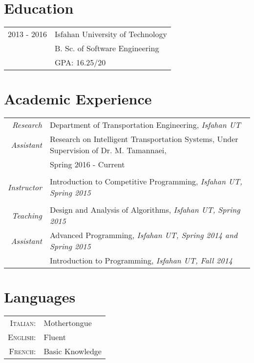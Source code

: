 \documentclass[a4paper,pt]{article}
\begin{document}
	
	\section{Education}
	\begin{tabular}{rl}	
		{2013 - 2016} & {Isfahan University of Technology}\\
					   & {\small B. Sc. of Software Engineering} \\
				       & {\small GPA: 16.25/20}
	\end{tabular}
	
	\section{Academic Experience}
		\begin{tabular}{r|p{11cm}}
			\emph{Research} & Department of Transportation Engineering, \emph{\color{darkgray}\small Isfahan UT} \\
			\emph{Assistant}&\footnotesize{Research on Intelligent Transportation Systems, Under Supervision of Dr. M. Tamannaei,}\\
			&\footnotesize{Spring 2016 - Current}\\
							
			\multicolumn{2}{c}{} \\
			\emph{Instructor} & Introduction to Competitive Programming, \emph{\color{darkgray}\small Isfahan UT, Spring 2015}\\
			\multicolumn{2}{c}{} \\
			\emph{Teaching} & Design and Analysis of Algorithms, \emph{\color{darkgray}\small Isfahan UT, Spring 2015} \vspace{1 mm}\\
			\emph{Assistant}& Advanced Programming, \emph{\color{darkgray}\small Isfahan UT, Spring 2014 and Spring 2015}\vspace{1 mm}\\
							& Introduction to Programming, \emph{\color{darkgray}\small Isfahan UT, Fall 2014}\\
		\end{tabular}
	
	
	\section{Languages}
	\begin{tabular}{rl}
		\textsc{Italian:}&Mothertongue\\
		\textsc{English:}&Fluent\\
		\textsc{French:}&Basic Knowledge\\
	\end{tabular}
	
\end{document}
